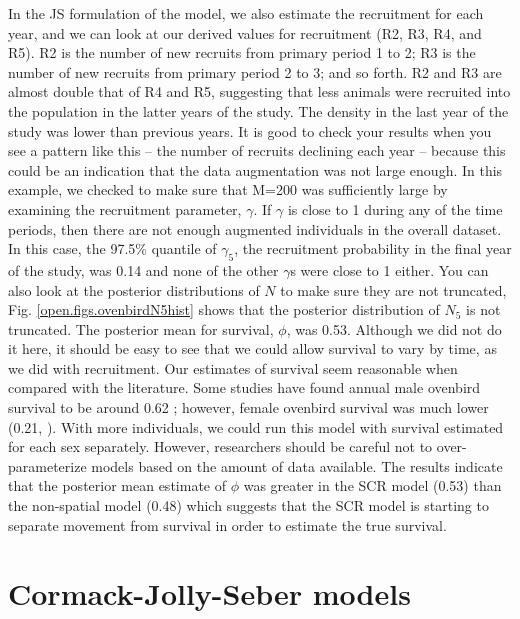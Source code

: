 In the JS formulation of the model, we also estimate the recruitment
for each year, and we can look at our derived values for recruitment
(R2, R3, R4, and R5).  R2 is the number of new recruits from primary
period 1 to 2; R3 is the number of new recruits from primary period 2
to 3; and so forth.  R2 and R3 are almost double that of R4 and R5,
suggesting that less animals were recruited into the population in the
latter years of the study.  The density in the last year of the study
was lower than previous years.  It is good to check your results when
you see a pattern like this -- the number of recruits declining each
year -- because this could be an indication that the data augmentation
was not large enough.  In this example, we checked to make sure that
M=200 was sufficiently large by examining the recruitment parameter,
$\gamma$.  If $\gamma$ is close to 1 during any of the time periods,
then there are not enough augmented individuals in the overall
dataset.  In this case, the 97.5\% quantile of $\gamma_5$, the
recruitment probability in the final year of the study, was 0.14 and
none of the other $\gamma$s were close to 1 either.  You can also look
at the posterior distributions of $N$ to make sure they are not
truncated, Fig. \ref{open.figs.ovenbirdN5hist} shows that the
posterior distribution of $N_5$ is not truncated. The posterior mean
for survival, $\phi$, was 0.53.  Although we did not do it here, it
should be easy to see that we could allow survival to vary by time, as
we did with recruitment.  Our estimates of survival seem reasonable
when compared with the literature.  Some studies have found annual
male ovenbird survival to be around 0.62
\citep{porneluzi_faaborg:1999, bayne_hobson:2002}; however, female
ovenbird survival was much lower (0.21,
\cite{bayne_hobson:2002}). With more individuals, we could run this
model with survival estimated for each sex separately.  However,
researchers should be careful not to over-parameterize models based on
the amount of data available.  The results indicate that the posterior
mean estimate of $\phi$ was greater in the SCR model (0.53) than the
non-spatial model (0.48) which suggests that the SCR model is starting
to separate movement from survival in order to estimate the true
survival.



\section{Cormack-Jolly-Seber models}

